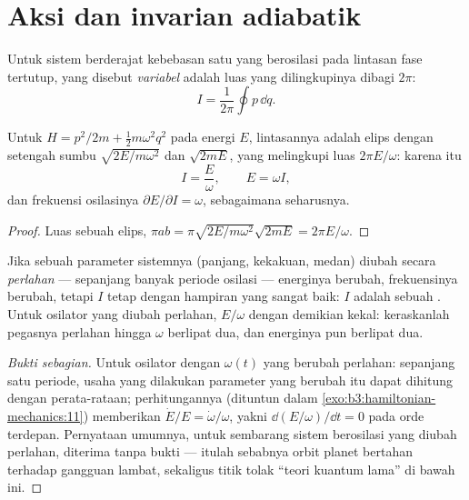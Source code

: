 \section{Aksi dan invarian adiabatik}

\begin{definition}\label{def:b3:hamiltonian-mechanics:action-variable}
Untuk sistem berderajat kebebasan satu yang berosilasi pada lintasan
fase tertutup, yang disebut \emph{variabel } adalah luas yang
dilingkupinya dibagi $2\pi$:
\[
I = \frac{1}{2\pi}\oint p\,\dd q .
\]
\end{definition}

\begin{proposition}\label{prop:b3:hamiltonian-mechanics:sho-action}
Untuk $H = p^2/2m + \tfrac12 m\omega^2q^2$ pada energi $E$, lintasannya
adalah elips dengan setengah sumbu $\sqrt{2E/m\omega^2}$ dan $\sqrt{2mE}$,
yang melingkupi luas $2\pi E/\omega$: karena itu
\[
I = \frac{E}{\omega} , \qquad E = \omega I ,
\]
dan frekuensi osilasinya $\partial E/\partial I = \omega$, sebagaimana
seharusnya.
\end{proposition}

\begin{proof}
Luas sebuah elips, $\pi ab = \pi\sqrt{2E/m\omega^2}\sqrt{2mE} =
2\pi E/\omega$.
\end{proof}

\begin{proposition}\label{prop:b3:hamiltonian-mechanics:adiabatic}
Jika sebuah parameter sistemnya (panjang, kekakuan, medan) diubah
secara \emph{perlahan} --- sepanjang banyak periode osilasi --- energinya
berubah, frekuensinya berubah, tetapi  $I$ tetap dengan hampiran
yang sangat baik: $I$ adalah sebuah \emph{}. Untuk
osilator yang diubah perlahan, $E/\omega$ dengan demikian kekal:
keraskanlah pegasnya perlahan hingga $\omega$ berlipat dua, dan
energinya pun berlipat dua.
\end{proposition}

\begin{proof}[Bukti sebagian]
Untuk osilator dengan $\omega(t)$ yang berubah perlahan: sepanjang satu
periode, usaha yang dilakukan parameter yang berubah itu dapat dihitung
dengan perata-rataan; perhitungannya (dituntun dalam
\cref{exo:b3:hamiltonian-mechanics:11}) memberikan
$\dot E/E = \dot\omega/\omega$, yakni $\dd(E/\omega)/\dd t = 0$ pada
orde terdepan. Pernyataan umumnya, untuk sembarang sistem berosilasi
yang diubah perlahan, diterima tanpa bukti --- itulah sebabnya orbit
planet bertahan terhadap gangguan lambat, sekaligus titik tolak ``teori
kuantum lama'' di bawah ini.
\end{proof}

